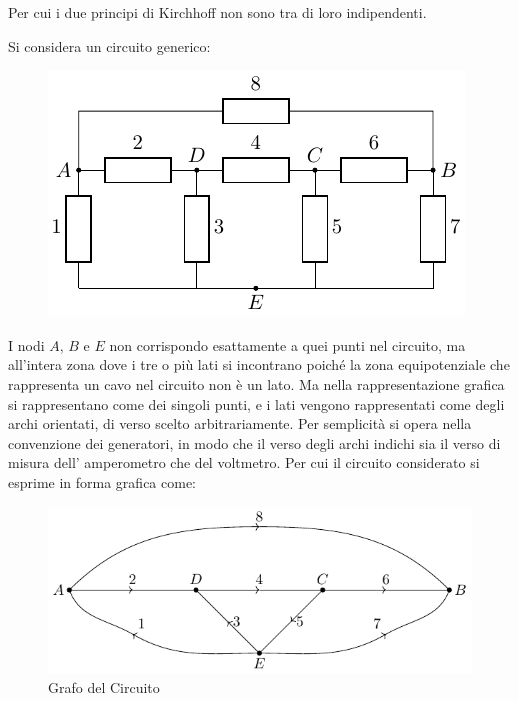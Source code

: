 \documentclass{article}
\numberwithin{equation}{subsection}
\begin{document}
Per cui i due principi di Kirchhoff non sono tra di loro indipendenti. 


Si considera un circuito generico:
\begin{figure}[H]%
    \centering
    \includegraphics{circuito-generico.pdf}%
    \label{fig:circuito-generico}
\end{figure}
I nodi $A$, $B$ e $E$ non corrispondo esattamente a quei punti nel circuito, ma all'intera zona dove i tre o più lati si incontrano poiché la zona equipotenziale che 
rappresenta un cavo nel circuito non è un lato. Ma nella rappresentazione grafica si rappresentano come dei singoli punti, e i lati vengono rappresentati come degli archi 
orientati, di verso scelto arbitrariamente. Per semplicità si opera nella convenzione dei generatori, in modo che il verso degli archi indichi sia il verso di misura dell'
amperometro che del voltmetro. Per cui il circuito considerato si esprime in forma grafica come:
\begin{figure}[H]%
    \centering
    \includegraphics{grafo-circuito-generico.pdf}%
    \caption{Grafo del Circuito}%
    \label{fig:grafo-circuito-generico}
\end{figure}
\end{document}
